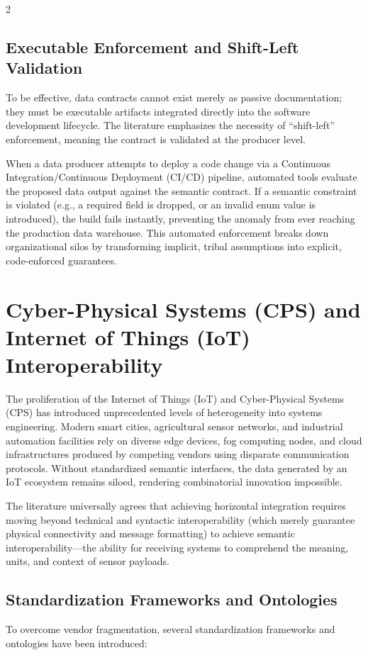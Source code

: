 \documentclass[11pt,letterpaper]{article}
\begin{document}
\begin{multicols*}{2}
\subsection{Executable Enforcement and Shift-Left Validation}
To be effective, data contracts cannot exist merely as passive documentation; they must be executable artifacts integrated directly into the software development lifecycle. The literature emphasizes the necessity of ``shift-left'' enforcement, meaning the contract is validated at the producer level.

When a data producer attempts to deploy a code change via a Continuous Integration/Continuous Deployment (CI/CD) pipeline, automated tools evaluate the proposed data output against the semantic contract. If a semantic constraint is violated (e.g., a required field is dropped, or an invalid enum value is introduced), the build fails instantly, preventing the anomaly from ever reaching the production data warehouse. This automated enforcement breaks down organizational silos by transforming implicit, tribal assumptions into explicit, code-enforced guarantees.

\section{Cyber-Physical Systems (CPS) and Internet of Things (IoT) Interoperability}
The proliferation of the Internet of Things (IoT) and Cyber-Physical Systems (CPS) has introduced unprecedented levels of heterogeneity into systems engineering. Modern smart cities, agricultural sensor networks, and industrial automation facilities rely on diverse edge devices, fog computing nodes, and cloud infrastructures produced by competing vendors using disparate communication protocols. Without standardized semantic interfaces, the data generated by an IoT ecosystem remains siloed, rendering combinatorial innovation impossible.

The literature universally agrees that achieving horizontal integration requires moving beyond technical and syntactic interoperability (which merely guarantee physical connectivity and message formatting) to achieve semantic interoperability—the ability for receiving systems to comprehend the meaning, units, and context of sensor payloads.

\subsection{Standardization Frameworks and Ontologies}
To overcome vendor fragmentation, several standardization frameworks and ontologies have been introduced:


\end{multicols*}
\end{document}
